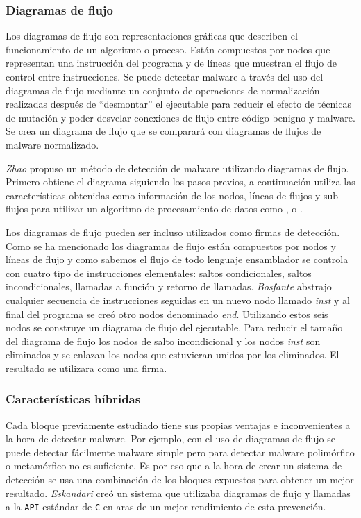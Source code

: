\documentclass[12pt]{article}
\newcommand{\newpar} {
    \vskip 0.5cm
}
\begin{document}
            \subsubsection{Diagramas de flujo}
                Los diagramas de flujo son representaciones gráficas que describen el funcionamiento de un algoritmo o proceso. Están compuestos por nodos que representan una instrucción del programa y de líneas que muestran el flujo de control entre instrucciones. Se puede detectar malware a través del uso del diagramas de flujo \cite{bib:malware_calls} mediante un conjunto de operaciones de normalización realizadas después de “desmontar” el ejecutable para reducir el efecto de técnicas de mutación y poder desvelar conexiones de flujo entre código benigno y malware. Se crea un diagrama de flujo que se comparará con diagramas de flujos de malware normalizado.

                \newpar

                \textit{Zhao} \cite{bib:malware_asm} propuso un método de detección de malware utilizando diagramas de flujo. Primero obtiene el diagrama siguiendo los pasos previos, a continuación utiliza las características obtenidas como información de los nodos, líneas de flujos y sub-flujos para utilizar un algoritmo de procesamiento de datos como \cite{bib:malware_f_a}, \cite{bib:malware_f_b} o \cite{bib:malware_f_b}.

                \newpar

                Los diagramas de flujo pueden ser incluso utilizados como firmas de detección. Como se ha mencionado los diagramas de flujo están compuestos por nodos y líneas de flujo y como sabemos el flujo de todo lenguaje ensamblador se controla con cuatro tipo de instrucciones elementales: saltos condicionales, saltos incondicionales, llamadas a función y retorno de llamadas. \textit{Bosfante} \cite{bib:malware_nodes} abstrajo cualquier secuencia de instrucciones seguidas en un nuevo nodo llamado \textit{inst} y al final del programa se creó otro nodos denominado \textit{end}. Utilizando estos seis nodos se construye un diagrama de flujo del ejecutable. Para reducir el tamaño del diagrama de flujo los nodos de salto incondicional y los nodos \textit{inst} son eliminados y se enlazan los nodos que estuvieran unidos por los eliminados. El resultado se utilizara como una firma.

            \subsubsection{Características híbridas}
                Cada bloque previamente estudiado tiene sus propias ventajas e inconvenientes a la hora de detectar malware. Por ejemplo, con el uso de diagramas de flujo se puede detectar fácilmente malware simple pero para detectar malware polimórfico o metamórfico no es suficiente. Es por eso que a la hora de crear un sistema de detección se usa una combinación de los bloques expuestos para obtener un mejor resultado. \textit{Eskandari} \cite{bib:malware_hybrid} creó un sistema que utilizaba diagramas de flujo y llamadas a la \texttt{API} estándar de \texttt{C} en aras de un mejor rendimiento de esta prevención.
\end{document}
